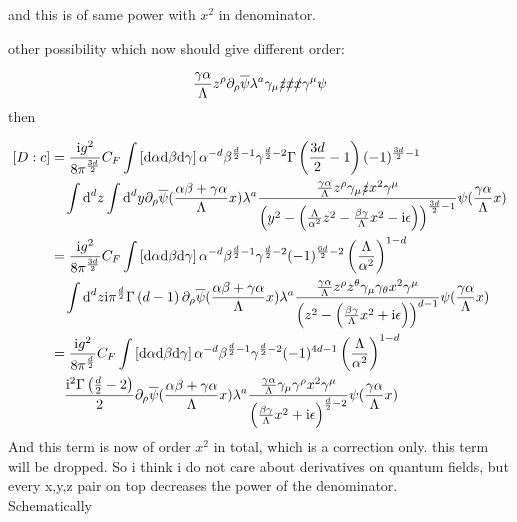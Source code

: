 and this is of same power with $x^2$ in denominator.

other possibility which now should give different order: 

\begin{align}
	\frac{\gamma\alpha}{\Lambda}z^\rho \partial_\rho \overline\psi \lambda^a\gamma_\mu \slashed z \slashed x \slashed x \gamma^\mu \psi	
\end{align}
then

\begin{align}
	\left[D:c\right]
	&=
	\frac{\text{i} g^2}{8\pi^{\frac{3d}{2}}} C_F \int\left[\text{d} \alpha \text{d} \beta \text{d} \gamma\right]\alpha^{-d}\beta^{\frac{d}{2}-1}\gamma^{\frac{d}{2}-2}\Gamma\left(\frac{3d}{2}-1\right) (-1)^{\frac{3d}{2}-1}
	\\&~~~
	\int \text{d}^d z \int \text{d}^d y \partial_\rho\overline\psi(\frac{\alpha \beta + \gamma \alpha}{\Lambda} x) \lambda^a \frac{\frac{\gamma\alpha}{\Lambda}z^\rho\gamma_\mu \slashed z x^2 \gamma^\mu }{\left( y^2 - \left( \frac{\Lambda}{\alpha^2}z^2- \frac{\beta\gamma}{\Lambda}x^2-\text{i} \epsilon\right)\right)^{\frac{3d}{2}-1}}\psi(\frac{\gamma \alpha}{\Lambda} x)
	\\
	&=
	\frac{\text{i} g^2}{8\pi^{\frac{3d}{2}}} C_F \int\left[\text{d} \alpha \text{d} \beta \text{d} \gamma\right]\alpha^{-d}\beta^{\frac{d}{2}-1}\gamma^{\frac{d}{2}-2}(-1)^{\frac{6d}{2}-2}\left(\frac{\Lambda}{\alpha^2}\right)^{1-d}
	\\&~~~
	\int \text{d}^d z \text{i} \pi^{\frac{d}{2}}\Gamma\left(d-1\right)\partial_\rho\overline\psi(\frac{\alpha \beta + \gamma \alpha}{\Lambda} x) \lambda^a \frac{\frac{\gamma\alpha}{\Lambda}z^\rho z^\theta\gamma_\mu \gamma_\theta x^2 \gamma^\mu }{\left(z^2- \left(  \frac{\beta\gamma}{\Lambda}x^2+\text{i} \epsilon\right)\right)^{d-1}}\psi(\frac{\gamma \alpha}{\Lambda} x)
	\\
	&=	
	\frac{\text{i} g^2}{8\pi^{\frac{d}{2}}} C_F \int\left[\text{d} \alpha \text{d} \beta \text{d} \gamma\right]\alpha^{-d}\beta^{\frac{d}{2}-1}\gamma^{\frac{d}{2}-2}(-1)^{4d-1}\left(\frac{\Lambda}{\alpha^2}\right)^{1-d}
	\\&~~~
	\frac{\text{i}^2 \Gamma\left(\frac{d}{2}-2\right)}{2}\partial_\rho\overline\psi(\frac{\alpha \beta + \gamma \alpha}{\Lambda} x) \lambda^a \frac{\frac{\gamma\alpha}{\Lambda}\gamma_\mu \gamma^\rho x^2 \gamma^\mu }{\left(  \frac{\beta\gamma}{\Lambda}x^2+\text{i} \epsilon\right)^{\frac{d}{2}-2}}\psi(\frac{\gamma \alpha}{\Lambda} x)
\end{align}
And this term is now of order $x^2$ in total, which is a correction only. this term will be dropped. So i think i do not care about derivatives on quantum fields, but every x,y,z pair on top decreases the power of the denominator. \\
Schematically

